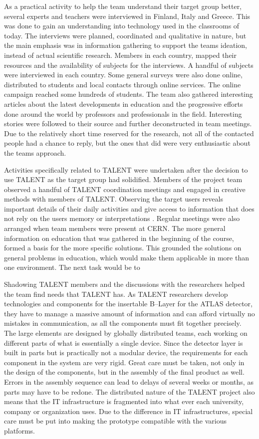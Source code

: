 \documentclass[english,12pt,a4paper,dvips]{article}
\begin{document}
As a practical activity to help the team understand their target group better, several experts and teachers were interviewed in Finland, Italy and Greece. This was done to gain an understanding into technology used in the classrooms of today. The interviews were planned, coordinated and qualitative in nature, but the main emphasis was in information gathering to support the teams ideation, instead of actual scientific research. Members in each country, mapped their resources and the availability of subjects for the interviews. A handful of subjects were interviewed in each country. Some general surveys were also done online, distributed to students and local contacts through online services. The online campaign reached some hundreds of students. The team also gathered interesting articles about the latest developments in education and the progressive efforts done around the world by professors and professionals in the field. Interesting stories were followed to their source and further deconstructed in team meetings. Due to the relatively short time reserved for the research, not all of the contacted people had a chance to reply, but the ones that did were very enthusiastic about the teams approach. 

Activities specifically related to TALENT were undertaken after the decision to use TALENT as the target group had solidified. Members of the project team observed a handful of TALENT coordination meetings and engaged in creative methods with members of TALENT. Observing the target users reveals important details of their daily activities and give access to information that does not rely on the users memory or interpretations \cite{Patnaik}. Regular meetings were also arranged when team members were present at CERN. The more general information on education that was gathered in the beginning of the course, formed a basis for the more specific solutions. This grounded the solutions on general problems in education, which would make them applicable in more than one environment. The next task would be to 

Shadowing TALENT members and the discussions with the researchers helped the team find needs that TALENT has. As TALENT researchers develop technologies and components for the insertable B--Layer for the ATLAS detector, they have to manage a massive amount of information and can afford virtually no mistakes in communication, as all the components must fit together precisely. The large elements are designed by globally distributed teams, each working on different parts of what is essentially a single device. Since the detector layer is built in parts but is practically not a modular device, the requirements for each component in the system are very rigid. Great care must be taken, not only in the design of the components, but in the assembly of the final product as well. Errors in the assembly sequence can lead to delays of several weeks or months, as parts may have to be redone. The distributed nature of the TALENT project also means that the IT infrastructure is fragmented into what ever each university, company or organization uses. Due to the difference in IT infrastructures, special care must be put into making the prototype compatible with the various platforms. 
\end{document}
